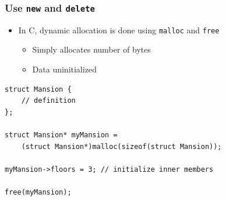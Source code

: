 \documentclass[table]{beamer}
\newcounter{rulecount}
\newcommand{\declarerule}{\textbf{\color{themeblue}{Rule \therulecount:}} }
\begin{document}



\begin{frame}[fragile]
    \frametitle{\declarerule Use \texttt{new} and \texttt{delete} }
    \begin{itemize}
        \item In C, dynamic allocation is done using \texttt{malloc} and \texttt{free}
            \begin{itemize}
                \item Simply allocates number of bytes
                \item Data uninitialized
            \end{itemize}
    \end{itemize}
    \begin{lstlisting}[title=Dynamically allocating a struct in C]
struct Mansion {
    // definition
};

struct Mansion* myMansion =
    (struct Mansion*)malloc(sizeof(struct Mansion));

myMansion->floors = 3; // initialize inner members

free(myMansion);
    \end{lstlisting}
\end{frame}
\end{document}
